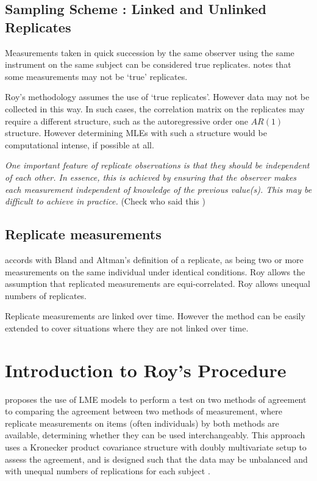 \documentclass[12pt, a4paper]{report}
\theoremstyle{plain}
\theoremstyle{definition}
\theoremstyle{remark}
\begin{document}
	\section{Sampling Scheme : Linked and Unlinked Replicates}
	Measurements taken in quick succession by the same observer using the same instrument on the same subject can be considered true replicates. \citet{ARoy2009} notes that some measurements may not be `true' replicates.
	
	Roy's methodology assumes the use of `true replicates'. However data may not be collected in this way. In such cases, the correlation matrix on the replicates may require a different structure, such as the autoregressive order one $AR(1)$ structure. However determining MLEs with such a structure would be computational intense, if possible at all.
	
	
	
	\emph{
		One important feature of replicate observations is that they should be independent
		of each other. In essence, this is achieved by ensuring that the observer makes each
		measurement independent of knowledge of the previous value(s). This may be difficult
		to achieve in practice.} (Check who said this
	)
	
	
\section{Replicate measurements}
\citet{ARoy2009} accords with Bland and Altman’s definition of a replicate, as being two or more measurements on the same individual under identical conditions.
Roy allows the assumption that replicated measurements are equi-correlated.
Roy allows unequal numbers of replicates.

Replicate measurements are linked over time. However the method can be easily extended to cover situations where they are not linked over time.



\chapter{Introduction to Roy's Procedure}

\citet{ARoy2009} proposes the use of LME models to perform a test on two methods of agreement to comparing the agreement between two methods of measurement, where replicate measurements on items (often individuals) by both methods are available, determining whether they can be used
interchangeably. This approach uses a Kronecker product covariance structure with doubly multivariate setup to
assess the agreement, and is designed such that the data may be unbalanced and with unequal numbers of replications for each subject \citep{ARoy2009}.
\end{document}
